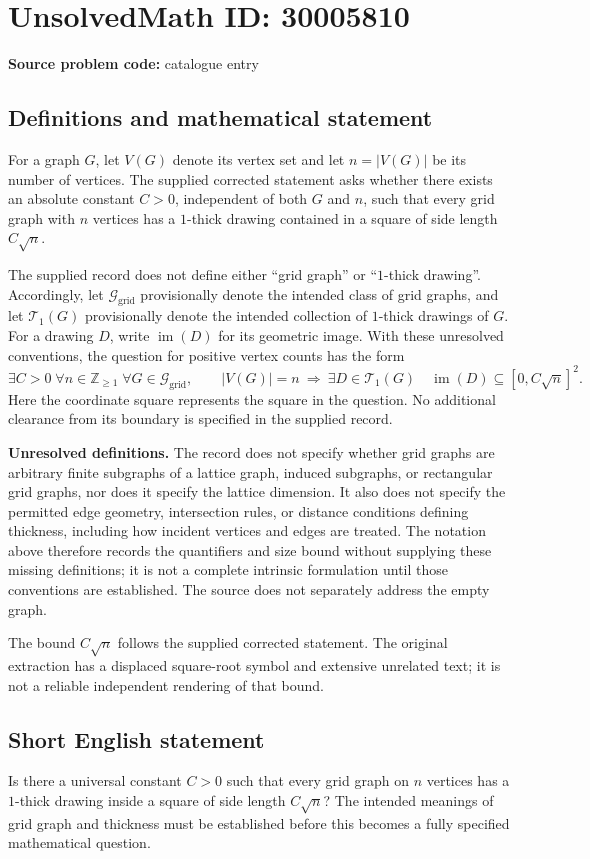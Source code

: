 \documentclass[11pt]{article}
\newcommand{\Z}{\mathbb{Z}}
\begin{document}
\section*{UnsolvedMath ID: 30005810}
\textbf{Source problem code:} catalogue entry
\subsection{Definitions and mathematical statement}
For a graph \(G\), let \(V(G)\) denote its vertex set and let \(n=|V(G)|\) be its number of vertices. The supplied corrected statement asks whether there exists an absolute constant \(C>0\), independent of both \(G\) and \(n\), such that every grid graph with \(n\) vertices has a \(1\)-thick drawing contained in a square of side length \(C\sqrt n\).

The supplied record does not define either ``grid graph'' or ``\(1\)-thick drawing''. Accordingly, let \(\mathcal G_{\mathrm{grid}}\) provisionally denote the intended class of grid graphs, and let \(\mathcal T_1(G)\) provisionally denote the intended collection of \(1\)-thick drawings of \(G\). For a drawing \(D\), write \(\operatorname{im}(D)\) for its geometric image. With these unresolved conventions, the question for positive vertex counts has the form
\[
\exists C>0\;\forall n\in\Z_{\geq 1}\;\forall G\in\mathcal G_{\mathrm{grid}},\qquad
|V(G)|=n\ \Longrightarrow\ 
\exists D\in\mathcal T_1(G)\quad
\operatorname{im}(D)\subseteq[0,C\sqrt n]^2.
\]
Here the coordinate square represents the square in the question. No additional clearance from its boundary is specified in the supplied record.

\textbf{Unresolved definitions.} The record does not specify whether grid graphs are arbitrary finite subgraphs of a lattice graph, induced subgraphs, or rectangular grid graphs, nor does it specify the lattice dimension. It also does not specify the permitted edge geometry, intersection rules, or distance conditions defining thickness, including how incident vertices and edges are treated. The notation above therefore records the quantifiers and size bound without supplying these missing definitions; it is not a complete intrinsic formulation until those conventions are established. The source does not separately address the empty graph.

The bound \(C\sqrt n\) follows the supplied corrected statement. The original extraction has a displaced square-root symbol and extensive unrelated text; it is not a reliable independent rendering of that bound.
\subsection{Short English statement}
Is there a universal constant \(C>0\) such that every grid graph on \(n\) vertices has a \(1\)-thick drawing inside a square of side length \(C\sqrt n\)? The intended meanings of grid graph and thickness must be established before this becomes a fully specified mathematical question.
\end{document}
